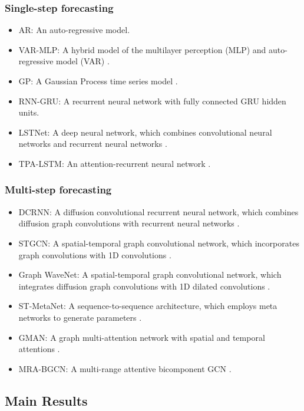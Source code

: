 \documentclass[sigconf]{acmart}
\begin{document}
\subsubsection{Single-step forecasting}
\begin{itemize}
	\item AR: An auto-regressive model.
\item VAR-MLP: A hybrid model of the multilayer perception (MLP) and auto-regressive model (VAR) \cite{zhang2003time}.
	\item GP: A Gaussian Process time series model \cite{roberts2013gaussian,frigola2016bayesian}.
	\item RNN-GRU: A recurrent neural network with fully connected GRU hidden units.
	\item LSTNet: A deep neural network, which combines convolutional neural networks and recurrent neural networks  \cite{lai2018modeling}.
	\item TPA-LSTM: An attention-recurrent neural network \cite{shih2019temporal}.
\end{itemize}
\subsubsection{Multi-step forecasting}
\begin{itemize}
	\item DCRNN: A diffusion convolutional recurrent neural network, which combines diffusion graph convolutions with recurrent neural networks \cite{li2018diffusion}.
	\item STGCN: A spatial-temporal graph convolutional network,  which incorporates graph convolutions with 1D convolutions \cite{yu2018spatio}.
	\item Graph WaveNet: A spatial-temporal graph convolutional network, which integrates diffusion graph convolutions with 1D dilated convolutions \cite{wu2019graph}.
	\item ST-MetaNet: A sequence-to-sequence architecture, which employs meta networks to generate parameters \cite{pan2019urban}.
	\item GMAN: A graph multi-attention network with spatial and temporal attentions \cite{zheng2020gman}. 
	\item MRA-BGCN: A multi-range attentive bicomponent GCN \cite{chen2020multi}.
\end{itemize}





\subsection{Main Results}
\end{document}
